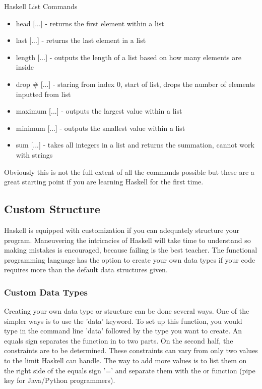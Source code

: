 \documentclass{article}
\begin{document}
    \medskip\medskip
    \caption{Haskell List Commands}
    \begin{itemize}
              \item head [...] - returns the first element within a list
              \item last [...] - returns the last element in a list
              \item length [...] - outputs the length of a list based on how many elements are inside
              \item drop # [...] - staring from index 0, start of list, drops the number of elements inputted from list
              \item maximum [...] - outputs the largest value within a list
              \item minimum [...] - outputs the smallest value within a list
              \item sum [...] - takes all integers in a list and returns the summation, cannot work with strings
    \end{itemize}
    
    \medskip
    \noindent Obviously this is not the full extent of all the commands possible but these are a great starting point if you are learning Haskell for the first time. 

\subsection{Custom Structure}
Haskell is equipped with customization if you can adequately structure your program. Maneuvering the intricacies of Haskell will take time to understand so making mistakes is encouraged, because failing is the best teacher. The functional programming language has the option to create your own data types if your code requires more than the default data structures given. 

    \subsubsection{Custom Data Types}
    Creating your own data type or structure can be done several ways. One of the simpler ways is to use the 'data' keyword. To set up this function, you would type in the command line 'data' followed by the type you want to create. An equals sign separates the function in to two parts. On the second half, the constraints are to be determined. These constraints can vary from only two values to the limit Haskell can handle. The way to add more values is to list them on the right side of the equals sign '=' and separate them with the or function (pipe key for Java/Python programmers).
    
\end{document}
